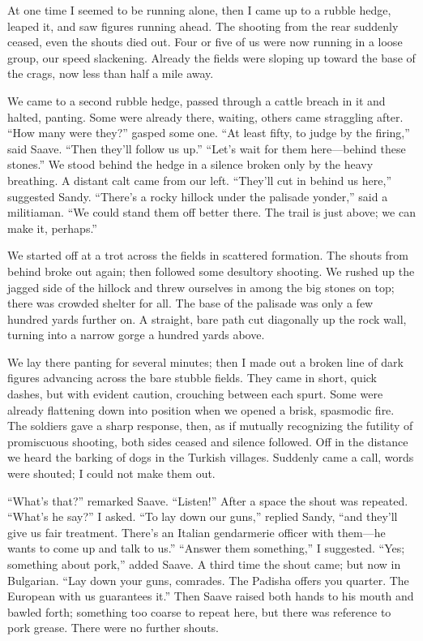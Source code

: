 \documentclass[a5paper,12pt]{book}
\begin{document}
At one time I seemed to be running alone, then I came up to a rubble hedge, leaped it, and saw figures running ahead. The shooting from the rear suddenly ceased, even the shouts died out. Four or five of us were now running in a loose group, our speed slackening. Already the fields were sloping up toward the base of the crags, now less than half a mile away.

We came to a second rubble hedge, passed through a cattle breach in it and halted, panting. Some were already there, waiting, others came straggling after. “How many were they?” gasped some one. “At least fifty, to judge by the firing,” said Saave. “Then they’ll follow us up.” “Let’s wait for them here—behind these stones.” We stood behind the hedge in a silence broken only by the heavy breathing. A distant calt came from our left. “They’ll cut in behind us here,” suggested Sandy. “There’s a rocky hillock under the palisade yonder,” said a militiaman. “We could stand them off better there. The trail is just above; we can make it, perhaps.”

We started off at a trot across the fields in scattered formation. The shouts from behind broke out again; then followed some desultory shooting. We rushed up the jagged side of the hillock and threw ourselves in among the big stones on top; there was crowded shelter for all. The base of the palisade was only a few hundred yards further on. A straight, bare path cut diagonally up the rock wall, turning into a narrow gorge a hundred yards above.

We lay there panting for several minutes; then I made out a broken line of dark figures advancing across the bare stubble fields. They came in short, quick dashes, but with evident caution, crouching between each spurt. Some were already flattening down into position when we opened a brisk, spasmodic fire. The soldiers gave a sharp response, then, as if mutually recognizing the futility of promiscuous shooting, both sides ceased and silence followed. Off in the distance we heard the barking of dogs in the Turkish villages. Suddenly came a call, words were shouted; I could not make them out.

“What’s that?” remarked Saave. “Listen!” After a space the shout was repeated. “What’s he say?” I asked. “To lay down our guns,” replied Sandy, “and they’ll give us fair treatment. There’s an Italian gendarmerie officer with them—he wants to come up and talk to us.” “Answer them something,” I suggested. “Yes; something about pork,” added Saave. A third time the shout came; but now in Bulgarian. “Lay down your guns, comrades. The Padisha offers you quarter. The European with us guarantees it.” Then Saave raised both hands to his mouth and bawled forth; something too coarse to repeat here, but there was reference to pork grease. There were no further shouts.
\end{document}
